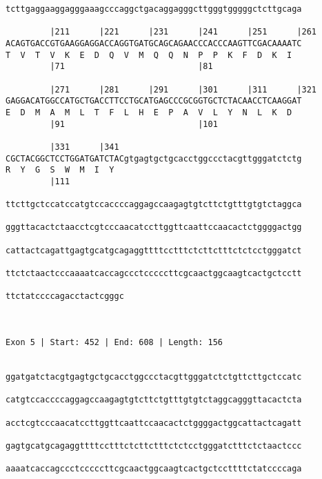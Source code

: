 \documentclass{article}
\begin{document}
\begin{Verbatim}
tcttgaggaaggagggaaagcccaggctgacaggagggcttgggtgggggctcttgcaga
                                                            
         |211      |221      |231      |241      |251      |261
ACAGTGACCGTGAAGGAGGACCAGGTGATGCAGCAGAACCCACCCAAGTTCGACAAAATC
T  V  T  V  K  E  D  Q  V  M  Q  Q  N  P  P  K  F  D  K  I  
         |71                           |81                  
  
         |271      |281      |291      |301      |311      |321
GAGGACATGGCCATGCTGACCTTCCTGCATGAGCCCGCGGTGCTCTACAACCTCAAGGAT
E  D  M  A  M  L  T  F  L  H  E  P  A  V  L  Y  N  L  K  D  
         |91                           |101                 
  
         |331      |341                                     
CGCTACGGCTCCTGGATGATCTACgtgagtgctgcacctggccctacgttgggatctctg
R  Y  G  S  W  M  I  Y                                      
         |111                                               
  
ttcttgctccatccatgtccaccccaggagccaagagtgtcttctgtttgtgtctaggca
                                                            
gggttacactctaacctcgtcccaacatccttggttcaattccaacactctggggactgg
                                                            
cattactcagattgagtgcatgcagaggttttcctttctcttctttctctcctgggatct
                                                            
ttctctaactcccaaaatcaccagccctcccccttcgcaactggcaagtcactgctcctt
                                                            
ttctatccccagacctactcgggc
                        
                        
 
Exon 5 | Start: 452 | End: 608 | Length: 156


ggatgatctacgtgagtgctgcacctggccctacgttgggatctctgttcttgctccatc
                                                            
catgtccaccccaggagccaagagtgtcttctgtttgtgtctaggcagggttacactcta
                                                            
acctcgtcccaacatccttggttcaattccaacactctggggactggcattactcagatt
                                                            
gagtgcatgcagaggttttcctttctcttctttctctcctgggatctttctctaactccc
                                                            
aaaatcaccagccctcccccttcgcaactggcaagtcactgctccttttctatccccaga
                                                            

\end{Verbatim}
\end{document}
